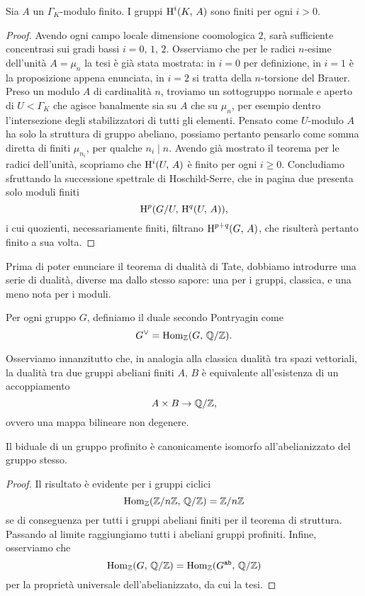 \begin{corollary} \label{finiti}
	Sia $ A $ un $ \Gamma_K $-modulo finito. I gruppi $ \operatorname{H}^i(K, \, A) $ sono finiti per ogni $ i > 0 $.
\end{corollary}
\begin{proof}
	Avendo ogni campo locale dimensione coomologica $ 2 $, sarà sufficiente concentrasi sui gradi bassi $ i = 0, \, 1, \, 2 $. Osserviamo che per le radici $ n $-esime dell'unità $ A = \mu_n $ la tesi è già stata mostrata: in $ i = 0 $ per definizione, in $ i = 1 $ è la proposizione appena enunciata, in $ i = 2 $ si tratta della $ n $-torsione del Brauer. Preso un modulo $ A $ di cardinalità $ n $, troviamo un sottogruppo normale e aperto di $ U < \Gamma_K $ che agisce banalmente sia su $ A $ che su $ \mu_n $, per esempio dentro l'intersezione degli stabilizzatori di tutti gli elementi. Pensato come $ U $-modulo $ A $ ha solo la struttura di gruppo abeliano, possiamo pertanto pensarlo come somma diretta di finiti $ \mu_{n_i} $, per qualche $ n_i \mid n $. Avendo già mostrato il teorema per le radici dell'unità, scopriamo che $ \operatorname{H}^i(U, \, A) $ è finito per ogni $ i \geq 0 $. Concludiamo sfruttando la successione spettrale di Hoschild-Serre, che in pagina due presenta solo moduli finiti
	\[ \operatorname{H}^p(G/U, \, \operatorname{H}^q(U, \, A)), \]
	i cui quozienti, necessariamente finiti, filtrano $ \operatorname{H}^{p+q}(G, \, A) $, che risulterà pertanto finito a sua volta.
\end{proof}

Prima di poter enunciare il teorema di dualità di Tate, dobbiamo introdurre una serie di dualità, diverse ma dallo stesso sapore: una per i gruppi, classica, e una meno nota per i moduli.

\begin{definition}
	Per ogni gruppo $ G $, definiamo il duale secondo Pontryagin come
	\[ G^\vee = \operatorname{Hom}_{\mathbb{Z}}(G, \, \mathbb{Q}/\mathbb{Z}). \]
\end{definition}

Osserviamo innanzitutto che, in analogia alla classica dualità tra spazi vettoriali, la dualità tra due gruppi abeliani finiti $ A, \, B $ è equivalente all'esistenza di un accoppiamento
\[ A \times B \to \mathbb{Q}/\mathbb{Z}, \]
ovvero una mappa bilineare non degenere.

\begin{proposition}
	Il biduale di un gruppo profinito è canonicamente isomorfo all'abelianizzato del gruppo stesso. 
\end{proposition}
\begin{proof}
	Il risultato è evidente per i gruppi ciclici
	\[ \operatorname{Hom}_{\mathbb{Z}}(\mathbb{Z}/n\mathbb{Z}, \, \mathbb{Q}/\mathbb{Z}) = \mathbb{Z}/n\mathbb{Z}  \]
	se di conseguenza per tutti i gruppi abeliani finiti per il teorema di struttura. Passando al limite raggiungiamo tutti i abeliani gruppi profiniti. Infine, osserviamo che
	\[ \operatorname{Hom}_{\mathbb{Z}}(G, \, \mathbb{Q}/\mathbb{Z})  = \operatorname{Hom}_{\mathbb{Z}}(G^\texttt{ab}, \, \mathbb{Q}/\mathbb{Z}) \]
	per la proprietà universale dell'abelianizzato, da cui la tesi.
\end{proof}

